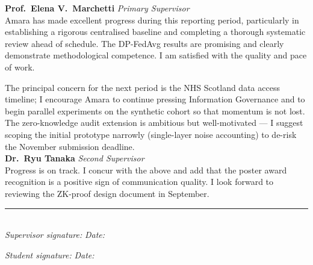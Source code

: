 \documentclass[11pt, a4paper]{article}
\begin{document}
\begin{rvcomment}
\textbf{Prof.\ Elena V.\ Marchetti} \hfill \textit{Primary Supervisor}\\[4pt]
Amara has made excellent progress during this reporting period, particularly in
establishing a rigorous centralised baseline and completing a thorough systematic
review ahead of schedule. The DP-FedAvg results are promising and clearly
demonstrate methodological competence. I am satisfied with the quality and pace
of work.

The principal concern for the next period is the NHS Scotland data access timeline;
I encourage Amara to continue pressing Information Governance and to begin parallel
experiments on the synthetic cohort so that momentum is not lost.
The zero-knowledge audit extension is ambitious but well-motivated — I suggest
scoping the initial prototype narrowly (single-layer noise accounting) to de-risk
the November submission deadline.\\[6pt]

\textbf{Dr.\ Ryu Tanaka} \hfill \textit{Second Supervisor}\\[4pt]
Progress is on track. I concur with the above and add that the poster award
recognition is a positive sign of communication quality. I look forward to
reviewing the ZK-proof design document in September.\\[6pt]

\rule{\linewidth}{0.4pt}\\[3pt]
\textit{Supervisor signature:}\quad\underline{\hspace{50mm}}\quad
\textit{Date:}\quad\underline{\hspace{28mm}}
\end{rvcomment}

\vspace{6pt}
\noindent\textit{Student signature:}\quad\underline{\hspace{50mm}}\quad
\textit{Date:}\quad\underline{\hspace{28mm}}
\end{document}
